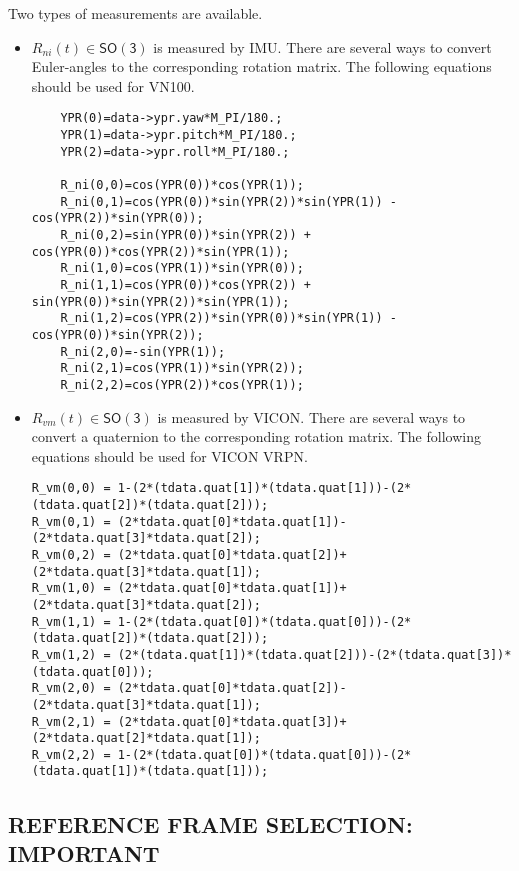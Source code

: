 \documentclass[11pt]{article}
\newcommand{\SO}{\ensuremath{\mathsf{SO(3)}}}
\begin{document}
Two types of measurements are available. 
\begin{itemize}
\item $R_{ni}(t)\in\SO$ is measured by IMU. There are several ways to convert Euler-angles to the corresponding rotation matrix. The following equations should be used for VN100.
{\footnotesize\selectfont\begin{verbatim}
	YPR(0)=data->ypr.yaw*M_PI/180.;
	YPR(1)=data->ypr.pitch*M_PI/180.;
	YPR(2)=data->ypr.roll*M_PI/180.;

	R_ni(0,0)=cos(YPR(0))*cos(YPR(1));
	R_ni(0,1)=cos(YPR(0))*sin(YPR(2))*sin(YPR(1)) - cos(YPR(2))*sin(YPR(0));
	R_ni(0,2)=sin(YPR(0))*sin(YPR(2)) + cos(YPR(0))*cos(YPR(2))*sin(YPR(1));
	R_ni(1,0)=cos(YPR(1))*sin(YPR(0));
	R_ni(1,1)=cos(YPR(0))*cos(YPR(2)) + sin(YPR(0))*sin(YPR(2))*sin(YPR(1));
	R_ni(1,2)=cos(YPR(2))*sin(YPR(0))*sin(YPR(1)) - cos(YPR(0))*sin(YPR(2));
	R_ni(2,0)=-sin(YPR(1));
	R_ni(2,1)=cos(YPR(1))*sin(YPR(2));
	R_ni(2,2)=cos(YPR(2))*cos(YPR(1));	
\end{verbatim}}




\item $R_{vm}(t)\in\SO$ is measured by VICON. There are several ways to convert a quaternion to the corresponding rotation matrix. The following equations should be used for VICON VRPN. 

{\footnotesize\selectfont\begin{verbatim}
R_vm(0,0) = 1-(2*(tdata.quat[1])*(tdata.quat[1]))-(2*(tdata.quat[2])*(tdata.quat[2]));
R_vm(0,1) = (2*tdata.quat[0]*tdata.quat[1])-(2*tdata.quat[3]*tdata.quat[2]);
R_vm(0,2) = (2*tdata.quat[0]*tdata.quat[2])+(2*tdata.quat[3]*tdata.quat[1]);
R_vm(1,0) = (2*tdata.quat[0]*tdata.quat[1])+(2*tdata.quat[3]*tdata.quat[2]);
R_vm(1,1) = 1-(2*(tdata.quat[0])*(tdata.quat[0]))-(2*(tdata.quat[2])*(tdata.quat[2]));
R_vm(1,2) = (2*(tdata.quat[1])*(tdata.quat[2]))-(2*(tdata.quat[3])*(tdata.quat[0]));
R_vm(2,0) = (2*tdata.quat[0]*tdata.quat[2])-(2*tdata.quat[3]*tdata.quat[1]);
R_vm(2,1) = (2*tdata.quat[0]*tdata.quat[3])+(2*tdata.quat[2]*tdata.quat[1]);
R_vm(2,2) = 1-(2*(tdata.quat[0])*(tdata.quat[0]))-(2*(tdata.quat[1])*(tdata.quat[1]));
\end{verbatim}}
\end{itemize}


\subsection{REFERENCE FRAME SELECTION: IMPORTANT}
\end{document}
